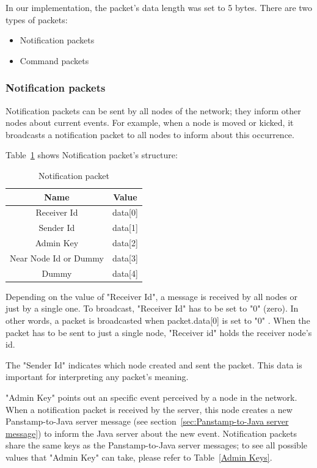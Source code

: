 In our implementation, the packet's data length was set to 5 bytes. There are two types of packets:
\begin{itemize}
\item Notification packets
\item Command packets
\end{itemize}

\subsubsection{Notification packets}
\label{sec:Notification packet}
Notification packets can be sent by all nodes of the network; they inform other nodes about current events. 
For example, when a node is moved or kicked, it broadcasts a notification packet to all nodes to inform about this occurrence. 

Table~\ref{Notification-packet} shows Notification packet's structure:

\begin{table}[h]
  \centering
  \begin{tabular}{ c | c }
    \hline
    \textbf{Name} & \textbf{Value}\\ [0.5ex]    
    \hline
    Receiver Id & data[0] \\
    Sender Id & data[1] \\
    Admin Key & data[2]\\
    Near Node Id or Dummy & data[3]\\
    Dummy & data[4]\\      
    \hline
  \end{tabular}
  \caption[Notification packet]%
          {Notification packet}
  \label{Notification-packet}
\end{table}

Depending on the value of "Receiver Id", a message is received by all nodes or just by a single one. To broadcast, "Receiver Id" has to be set to "0" (zero). In other words, a packet is broadcasted when packet.data[0] is set to "0" \cite{CC1101-ref}. When the packet has to be sent to just a single node, "Receiver id" holds the receiver node's id.

The "Sender Id" indicates which node created and sent the packet. This data is important for interpreting any packet's meaning.

"Admin Key" points out an specific event perceived by a node in the network. When a notification packet is received by the server, this node creates a new Panstamp-to-Java server message (see section~\ref{sec:Panstamp-to-Java server message}) to inform the Java server about the new event. Notification packets share the same keys as the Panstamp-to-Java server messages; to see all possible values that "Admin Key" can take, please refer to Table~\ref{Admin Keys}. 

